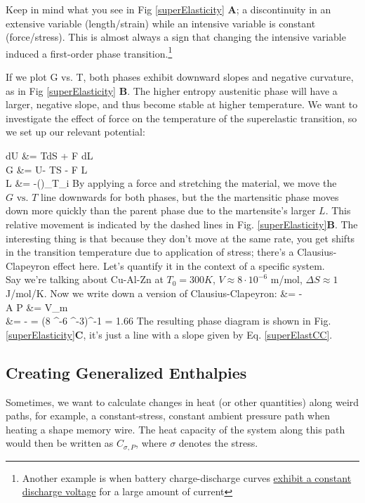 \documentclass[12pt]{article}
\begin{document}
Keep in mind what you see in Fig \ref{superElasticity} \textbf{A}; a discontinuity in an extensive variable (length/strain) while an intensive variable is constant (force/stress). This is almost always a sign that changing the intensive variable induced a first-order phase transition.\footnote{Another example is when battery charge-discharge curves \href{http://i.stack.imgur.com/UkodS.gif}{exhibit a constant discharge voltage} for a large amount of current}

If we plot G vs. T, both phases exhibit downward slopes and negative curvature, as in Fig \ref{superElasticity} \textbf{B}. The higher entropy austenitic phase will have a larger, negative slope, and thus become stable at higher temperature. We want to investigate the effect of force on the temperature of the superelastic transition, so we set up our relevant potential:

\eqs
dU &= TdS + F dL\\
G &= U- T\cdot S - F \cdot L\\
L &= -\left(\right)_{T_i}
\eqe
By applying a force and stretching the material, we move the $G\text{ vs. }T$ line downwards for both phases, but the the martensitic phase moves down more quickly than the parent phase due to the martensite's larger $L$. This relative movement is indicated by the dashed lines in Fig. \ref{superElasticity}\textbf{B}. The interesting thing is that because they don't move at the same rate, you get shifts in the transition temperature due to application of stress; there's a Clausius-Clapeyron effect here. Let's quantify it in the context of a specific system.\\

Say we're talking about Cu-Al-Zn at $T_0 = 300K$, $V \approx 8 \cdot 10^{-6}$ m\three/mol, $\Delta S \approx 1$ J/mol/K.  Now we write down a version of Clausius-Clapeyron:
\eqs
{}  &= -\\
A \Delta P &= V_m \Delta \epsilon\\
 &= - = (8 ^-6  ^{-3})^{-1} = 1.66 
\label{superElastCC}
\eqe
The resulting phase diagram is shown in Fig. \ref{superElasticity}\textbf{C}, it's just a line with a slope given by Eq. \ref{superElastCC}.


\subsection{Creating Generalized Enthalpies}
Sometimes, we want to calculate changes in heat (or other quantities) along weird paths, for example, a constant-stress, constant ambient pressure path when heating a shape memory wire. The heat capacity of the system along this path would then be written as \(C_{\sigma ,P}\), where $\sigma $ denotes the stress.
\end{document}
